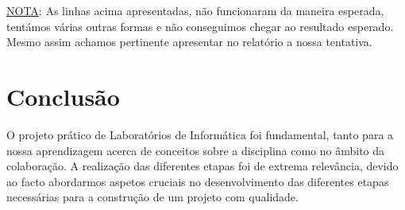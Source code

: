 \documentclass[a4wide]{report}
\begin{document}
{{{{\uline{NOTA}: As linhas acima apresentadas, não funcionaram da maneira esperada, tentámos várias outras formas e não conseguimos chegar ao resultado esperado. Mesmo assim achamos pertinente apresentar no relatório a nossa tentativa.

\newpage
\chapter{Conclusão} 
\label{cap:conclusao} %
\Large

O projeto prático de Laboratórios de Informática foi fundamental, tanto para a nossa aprendizagem acerca de conceitos sobre a disciplina como no âmbito da colaboração. A realização das diferentes etapas foi de extrema relevância, devido ao facto abordarmos aspetos cruciais no desenvolvimento das diferentes etapas necessárias para a construção de um projeto com qualidade.

}}}}
\end{document}
